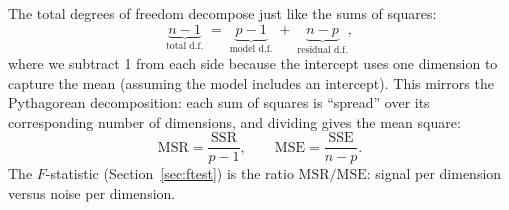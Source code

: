 \begin{remark}
The total degrees of freedom decompose just like the sums of squares:
\[
  \underbrace{n-1}_{\text{total d.f.}}
  \;=\;
  \underbrace{p-1}_{\text{model d.f.}}
  \;+\;
  \underbrace{n-p}_{\text{residual d.f.}},
\]
where we subtract 1 from each side because the intercept uses one dimension
to capture the mean (assuming the model includes an intercept).
This mirrors the Pythagorean decomposition: each sum of squares is
``spread'' over its corresponding number of dimensions, and dividing gives
the mean square:
\[
  \text{MSR} = \frac{\text{SSR}}{p-1},
  \qquad
  \text{MSE} = \frac{\text{SSE}}{n-p}.
\]
The $F$-statistic (Section~\ref{sec:ftest}) is the ratio $\text{MSR}/\text{MSE}$:
signal per dimension versus noise per dimension.
\end{remark}
